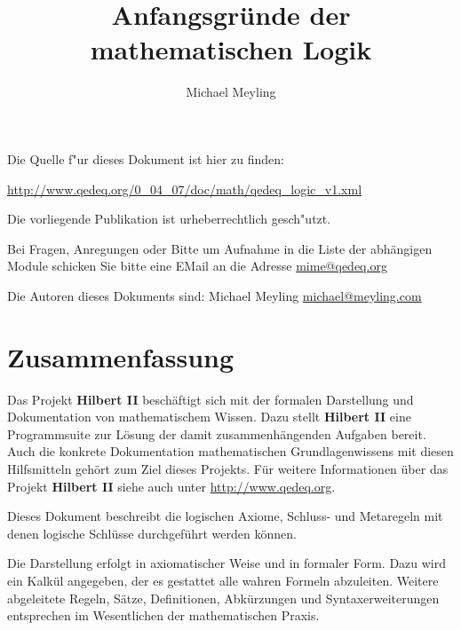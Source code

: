 \documentclass[a4paper,german,10pt,twoside]{book}
\title{Anfangsgr{\"u}nde der mathematischen Logik}
\author{
Michael Meyling
}
\theoremstyle{definition}
\theoremstyle{remark}
\begin{document}
\maketitle

\setlength{\parskip}{5pt plus 2pt minus 1pt}
\mbox{}
\vfill

\par
Die Quelle f{"ur} dieses Dokument ist hier zu finden:
\par
\url{http://www.qedeq.org/0_04_07/doc/math/qedeq_logic_v1.xml}

\par
Die vorliegende Publikation ist urheberrechtlich gesch{"u}tzt.
\par
Bei Fragen, Anregungen oder Bitte um Aufnahme in die Liste der abh{\"a}ngigen Module schicken Sie bitte eine EMail an die Adresse \href{mailto:mime@qedeq.org}{mime@qedeq.org}

\par
Die Autoren dieses Dokuments sind:
Michael Meyling \href{mailto:michael@meyling.com}{michael@meyling.com}



\setlength{\parskip}{0pt}
\tableofcontents

\setlength{\parskip}{5pt plus 2pt minus 1pt}

\chapter*{Zusammenfassung} \label{chapter1} \hypertarget{chapter1}{}

Das Projekt \textbf{Hilbert II} besch{\"a}ftigt sich mit der formalen Darstellung und Dokumentation von mathematischem Wissen. Dazu stellt \textbf{Hilbert II} eine Programmsuite zur L{\"o}sung der damit zusammenh{\"a}ngenden Aufgaben bereit. Auch die konkrete Dokumentation mathematischen Grundlagenwissens mit diesen Hilfsmitteln geh{\"o}rt zum Ziel dieses Projekts. 
F{\"u}r weitere Informationen {\"u}ber das Projekt \textbf{Hilbert II} siehe auch unter \url{http://www.qedeq.org}.

\par
Dieses Dokument beschreibt die logischen Axiome, Schluss- und Metaregeln mit denen logische Schl{\"u}sse durchgef{\"u}hrt werden k{\"o}nnen.

\par
Die Darstellung erfolgt in axiomatischer Weise und in formaler Form. Dazu wird ein Kalk{\"u}l angegeben, der es gestattet alle wahren Formeln abzuleiten. Weitere abgeleitete Regeln, S{\"a}tze, Definitionen, Abk{\"u}rzungen und Syntaxerweiterungen entsprechen im Wesentlichen der mathematischen Praxis.
\end{document}

